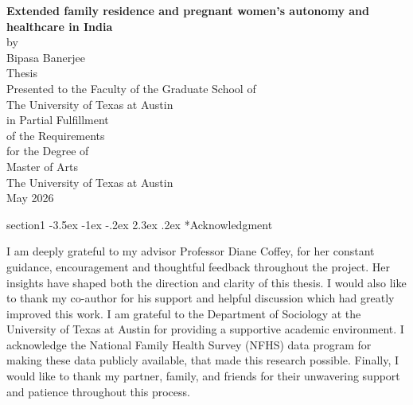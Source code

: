 \documentclass[12pt]{article}
\makeatletter
\renewenvironment{titlepage}
  {%
    \if@twocolumn
      \@restonecoltrue\onecolumn
    \else
      \@restonecolfalse\newpage
    \fi
    \thispagestyle{plain}%
  }%
  {%
    \if@restonecol\twocolumn \else \newpage \fi
  }
\renewcommand\section{\@startsection
{section}{1}{\z@}
{-3.5ex \@plus -1ex \@minus -.2ex}
{2.3ex \@plus.2ex}
{\centering\normalfont\Large\bfseries}}
\makeatother
\begin{document}
\begin{titlepage}
    \thispagestyle{plain}
    \centering
    
    \vspace*{1in}
    
    \textbf{Extended family residence and pregnant women's autonomy and healthcare in India}\\[2em]
    
    by\\[1em]
    
    Bipasa Banerjee\\[2em]
    
    Thesis\\[2em]
    
    Presented to the Faculty of the Graduate School of\\
    The University of Texas at Austin\\[1em]
    
    in Partial Fulfillment\\
    of the Requirements\\
    for the Degree of\\[1em]
    
    Master of Arts\\[2em]
    
    The University of Texas at Austin\\[1em]
    
    May 2026
    
    \vfill
\end{titlepage}


\section*{Acknowledgment}

\thispagestyle{plain}

\noindent
I am deeply grateful to my advisor Professor Diane Coffey, for her constant guidance, encouragement and thoughtful feedback throughout the project. Her insights have shaped both the direction and clarity of this thesis. I would also like to thank my co-author for his support and helpful discussion which had greatly improved this work. I am grateful to the Department of Sociology at the University of Texas at Austin for providing a supportive academic environment. I acknowledge the National Family Health Survey (NFHS) data program for making these data publicly available, that made this research possible. Finally, I would like to thank my partner, family, and friends for their unwavering support and patience throughout this process. 
\end{document}
